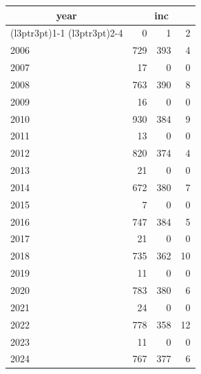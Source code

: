 \footnotesize\begin{tabular}[t]{lrrr}
\toprule
\multicolumn{1}{c}{year} & \multicolumn{3}{c}{inc} \\
\cmidrule(l{3pt}r{3pt}){1-1} \cmidrule(l{3pt}r{3pt}){2-4}
  & 0 & 1 & 2\\
\midrule
2006 & 729 & 393 & 4\\
2007 & 17 & 0 & 0\\
2008 & 763 & 390 & 8\\
2009 & 16 & 0 & 0\\
2010 & 930 & 384 & 9\\
2011 & 13 & 0 & 0\\
2012 & 820 & 374 & 4\\
2013 & 21 & 0 & 0\\
2014 & 672 & 380 & 7\\
2015 & 7 & 0 & 0\\
2016 & 747 & 384 & 5\\
2017 & 21 & 0 & 0\\
2018 & 735 & 362 & 10\\
2019 & 11 & 0 & 0\\
2020 & 783 & 380 & 6\\
2021 & 24 & 0 & 0\\
2022 & 778 & 358 & 12\\
2023 & 11 & 0 & 0\\
2024 & 767 & 377 & 6\\
\bottomrule
\end{tabular}
